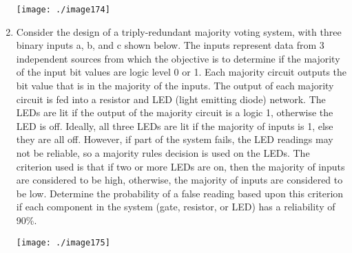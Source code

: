 \begin{enumerate}
\texttt{[image: ./image174]}

\item
  Consider the design of a triply-redundant majority voting system, with
  three binary inputs a, b, and c shown below. The inputs represent data
  from 3 independent sources from which the objective is to determine if
  the majority of the input bit values are logic level 0 or 1. Each
  majority circuit outputs the bit value that is in the majority of the
  inputs. The output of each majority circuit is fed into a resistor and
  LED (light emitting diode) network. The LEDs are lit if the output of
  the majority circuit is a logic 1, otherwise the LED is off. Ideally,
  all three LEDs are lit if the majority of inputs is 1, else they are
  all off. However, if part of the system fails, the LED readings may
  not be reliable, so a majority rules decision is used on the LEDs. The
  criterion used is that if two or more LEDs are on, then the majority
  of inputs are considered to be high, otherwise, the majority of inputs
  are considered to be low. Determine the probability of a false reading
  based upon this criterion if each component in the system (gate,
  resistor, or LED) has a reliability of 90\%.

\texttt{[image: ./image175]}

\end{enumerate}
